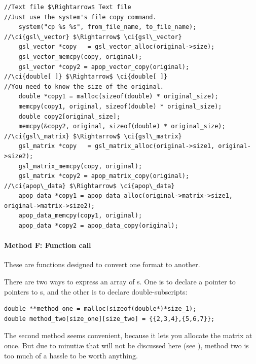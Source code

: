  
  
\begin{lstlisting}
//Text file $\Rightarrow$ Text file
//Just use the system's file copy command.
    system("cp %s %s", from_file_name, to_file_name);
//\ci{gsl\_vector} $\Rightarrow$ \ci{gsl\_vector}
    gsl_vector *copy   = gsl_vector_alloc(original->size);
    gsl_vector_memcpy(copy, original);
    gsl_vector *copy2 = apop_vector_copy(original);
//\ci{double[ ]} $\Rightarrow$ \ci{double[ ]}
//You need to know the size of the original.
    double *copy1 = malloc(sizeof(double) * original_size);
    memcpy(copy1, original, sizeof(double) * original_size);
    double copy2[original_size];
    memcpy(&copy2, original, sizeof(double) * original_size);
//\ci{gsl\_matrix} $\Rightarrow$ \ci{gsl\_matrix}
    gsl_matrix *copy   = gsl_matrix_alloc(original->size1, original->size2);
    gsl_matrix_memcpy(copy, original);
    gsl_matrix *copy2 = apop_matrix_copy(original);
//\ci{apop\_data} $\Rightarrow$ \ci{apop\_data}
    apop_data *copy1 = apop_data_alloc(original->matrix->size1, original->matrix->size2);
    apop_data_memcpy(copy1, original);
    apop_data *copy2 = apop_data_copy(original);
\end{lstlisting}

\paragraph{Method F: Function call}
 
 
 

These are functions designed to convert one format to another.

There are two ways to express an array of s. One is to
declare a pointer to pointers to s, and the other is to
declare double-subscripts:
\begin{lstlisting}
double **method_one = malloc(sizeof(double*)*size_1);
double method_two[size_one][size_two] = {{2,3,4},{5,6,7}};
\end{lstlisting}
The second method seems convenient, because it lets you allocate the
matrix at once. But due to minuti\ae{} that will not be discussed here
(see \citet[p 113]{kandr:c}), method two is too much of a hassle to
be worth anything. 

